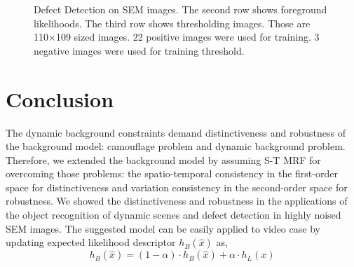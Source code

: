 \documentclass[conference]{IEEEtran}
\begin{document}
\begin{figure}[!t]
  \hfill
  \hfill
  \hfill
  \caption{Defect Detection on SEM images. The second row shows foreground likelihoods. The third row shows thresholding images. Those are 110×109 sized images. 22 positive images were used for training. 3 negative images were used for training threshold.}
\end{figure}



\section{Conclusion}

The dynamic background constraints demand distinctiveness and robustness of the background model: camouflage problem and dynamic background problem. Therefore, we extended the background model by assuming S-T MRF for overcoming those problems: the spatio-temporal consistency in the first-order space for distinctiveness and variation consistency in the second-order space for robustness. We showed the distinctiveness and robustness in the applications of the object recognition of dynamic scenes and defect detection in highly noised SEM images.
The suggested model can be easily applied to video case by updating expected likelihood descriptor \begin{math} h_B(\hat{x}) \end{math} as,
\begin{equation}\label{eq:160}
  h_B(\hat{x}) = (1 - \alpha) \cdot h_B(\hat{x}) + \alpha \cdot h_L(x)
\end{equation}
\end{document}
